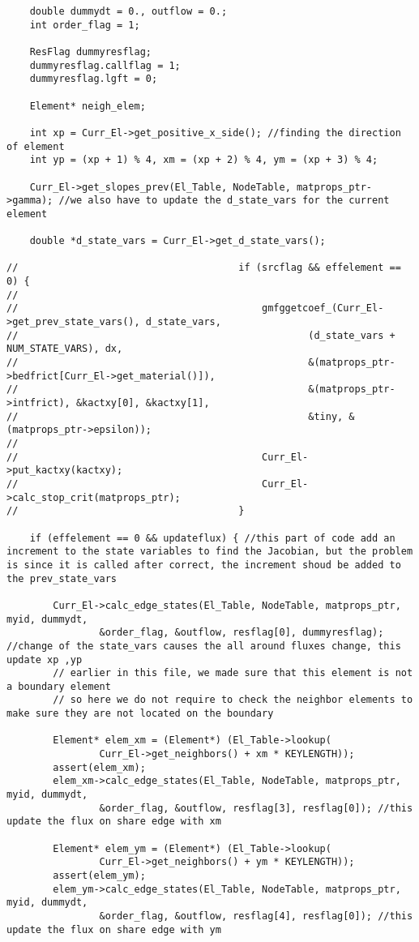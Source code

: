 \documentclass[a4paper,10pt]{article}
\begin{document}
\begin{lstlisting}
	double dummydt = 0., outflow = 0.;
	int order_flag = 1;

	ResFlag dummyresflag;
	dummyresflag.callflag = 1;
	dummyresflag.lgft = 0;

	Element* neigh_elem;

	int xp = Curr_El->get_positive_x_side(); //finding the direction of element
	int yp = (xp + 1) % 4, xm = (xp + 2) % 4, ym = (xp + 3) % 4;

	Curr_El->get_slopes_prev(El_Table, NodeTable, matprops_ptr->gamma);	//we also have to update the d_state_vars for the current element

	double *d_state_vars = Curr_El->get_d_state_vars();

//										if (srcflag && effelement == 0) {
//
//											gmfggetcoef_(Curr_El->get_prev_state_vars(), d_state_vars,
//													(d_state_vars + NUM_STATE_VARS), dx,
//													&(matprops_ptr->bedfrict[Curr_El->get_material()]),
//													&(matprops_ptr->intfrict), &kactxy[0], &kactxy[1],
//													&tiny, &(matprops_ptr->epsilon));
//
//											Curr_El->put_kactxy(kactxy);
//											Curr_El->calc_stop_crit(matprops_ptr);
//										}

	if (effelement == 0 && updateflux) { //this part of code add an increment to the state variables to find the Jacobian, but the problem is since it is called after correct, the increment shoud be added to the prev_state_vars

		Curr_El->calc_edge_states(El_Table, NodeTable, matprops_ptr, myid, dummydt,
				&order_flag, &outflow, resflag[0], dummyresflag); //change of the state_vars causes the all around fluxes change, this update xp ,yp
		// earlier in this file, we made sure that this element is not a boundary element
		// so here we do not require to check the neighbor elements to make sure they are not located on the boundary

		Element* elem_xm = (Element*) (El_Table->lookup(
				Curr_El->get_neighbors() + xm * KEYLENGTH));
		assert(elem_xm);
		elem_xm->calc_edge_states(El_Table, NodeTable, matprops_ptr, myid, dummydt,
				&order_flag, &outflow, resflag[3], resflag[0]); //this update the flux on share edge with xm

		Element* elem_ym = (Element*) (El_Table->lookup(
				Curr_El->get_neighbors() + ym * KEYLENGTH));
		assert(elem_ym);
		elem_ym->calc_edge_states(El_Table, NodeTable, matprops_ptr, myid, dummydt,
				&order_flag, &outflow, resflag[4], resflag[0]); //this update the flux on share edge with ym


\end{lstlisting}
\end{document}
